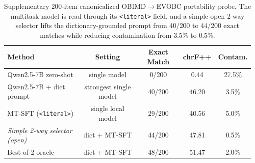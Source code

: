 \begin{table}[t]
\centering
\small
\begin{tabular}{lcccc}
\toprule
Method & Setting & Exact Match & chrF++ & Contam. \\
\midrule
Qwen2.5-7B zero-shot & single model & 0/200 & 0.44 & 27.5\% \\
Qwen2.5-7B + dict prompt & strongest single model & 40/200 & 46.20 & 3.5\% \\
MT-SFT (\texttt{<literal>}) & single local model & 29/200 & 40.56 & 5.0\% \\
\textit{Simple 2-way selector (open)} & dict + MT-SFT & 44/200 & 47.81 & 0.5\% \\
Best-of-2 oracle & dict + MT-SFT & 48/200 & 51.47 & 2.0\% \\
\bottomrule
\end{tabular}
\caption{Supplementary 200-item canonicalized OBIMD$\rightarrow$EVOBC portability probe. The multitask model is read through its \texttt{<literal>} field, and a simple open 2-way selector lifts the dictionary-grounded prompt from 40/200 to 44/200 exact matches while reducing contamination from 3.5\% to 0.5\%.}
\label{tab:oracle-portability}
\end{table}
